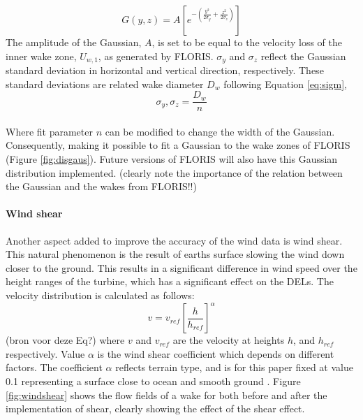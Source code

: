 \begin{equation}
\label{eq:gaus}
G(y, z) = A [e^{-(\frac{y^2}{2\sigma_y} + \frac{z^2}{2\sigma_z})}]
\end{equation}
The amplitude of the Gaussian, $A$, is set to be equal to the velocity loss of the inner wake zone, $U_{w,1}$, as generated by FLORIS. $\sigma_y$ and $\sigma_z$ reflect the Gaussian standard deviation in horizontal and vertical direction, respectively. These standard deviations are related wake diameter $D_{w}$ following Equation \ref{eq:sigm},
\begin{equation}
\label{eq:sigm}
\sigma_y,\sigma_z = \frac{D_{w}}{n} 
\end{equation}
\\
Where fit parameter $n$ can be modified to change the width of the Gaussian. Consequently, making it possible to fit a Gaussian to the wake zones of FLORIS (Figure \ref{fig:disgaus}). Future versions of FLORIS will also have this Gaussian distribution implemented. (clearly note the importance of the relation between the Gaussian and the wakes from FLORIS!!) 

\paragraph{Wind shear} \label{sec:windshear}
Another aspect added to improve the accuracy of the wind data is wind shear. This natural phenomenon is the result of earths surface slowing the wind down closer to the ground. This results in a significant difference in wind speed over the height ranges of the turbine, which has a significant effect on the DELs\cite{Firtin2011}.  The velocity distribution is calculated as follows: 
\begin{equation}
\label{eq:shear}
v = v_{ref} \left[\frac{h}{h_{ref}}\right]^\alpha
\end{equation}
(bron voor deze Eq?)
where $v$ and $v_{ref}$ are the velocity at heights $h$, and $h_{ref}$  respectively. Value $\alpha$ is the wind shear coefficient which depends on different factors. The coefficient $\alpha$  reflects terrain type, and is for this paper fixed at value 0.1 representing a surface close to ocean and smooth ground \cite{Firtin2011}. Figure \ref{fig:windshear} shows the flow fields of a wake for both before and after the implementation of shear, clearly showing the effect of the shear effect.

